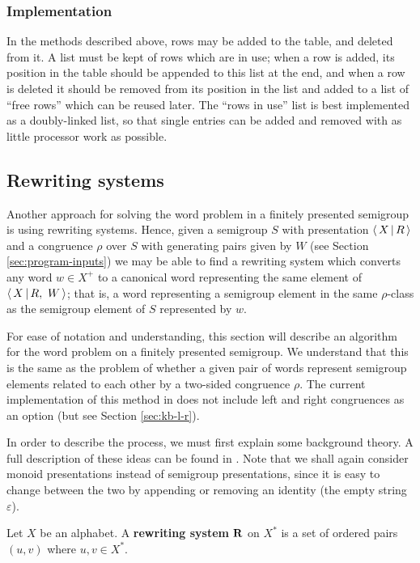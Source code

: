 \subsubsection{Implementation}

In the methods described above,
rows may be added to the table, and deleted from it.  A list must be kept of
rows which are in use; when a row is added, its position in the table should be
appended to this list at the end, and when a row is deleted it should be removed
from its position in the list and added to a list of ``free rows'' which can be
reused later.  The ``rows in use'' list is best implemented as a doubly-linked
list, so that single entries can be added and removed with as little processor
work as possible.

\subsection{Rewriting systems}
\label{sec:kb}

Another approach for solving the word problem in a finitely presented semigroup
is using rewriting systems.  Hence, given a semigroup $S$ with presentation
$\left\langle \, X \, \middle| \, R \, \right\rangle$ and a congruence $\rho$ over $S$ with generating pairs given by $W$
(see Section \ref{sec:program-inputs})
we may be able to find a rewriting system which converts any word $w \in X^+$ to
a canonical word representing the same element of $\left\langle \, X \, \middle| \, R,\ W \, \right\rangle$;
that is, a word representing a semigroup element in the same $\rho$-class as
the semigroup element of $S$ represented by $w$.

For ease of notation and understanding, this section will describe an algorithm
for the word problem on a finitely presented semigroup.  We understand that this
is the same as the problem of whether a given pair of words represent semigroup
elements related to each other by a two-sided congruence $\rho$.  The current
implementation of this method in \libsemigroups{} does not include left and
right congruences as an option (but see Section \ref{sec:kb-l-r}).

In order
to describe the process, we must first explain some background theory.  A full
description of these ideas can be found in \cite[Section 12.2]{cgt}.  Note that
we shall again consider monoid presentations instead of semigroup presentations,
since it is easy to change between the two by appending or removing an identity
(the empty string $\varepsilon$).

\begin{definition}
  \label{def:rws}
  Let $X$ be an alphabet.  A \textbf{rewriting system} $\mathbf{R}$ on $X^*$ is a set
  of ordered pairs $(u,v)$ where $u, v \in X^*$.
\end{definition}

